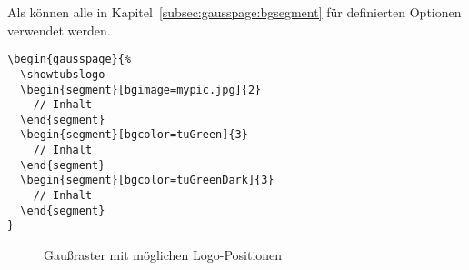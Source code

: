 Als  können alle in Kapitel~\ref{subsec:gausspage:bgsegment}
für  definierten Optionen verwendet werden. %


\begin{lstlisting}[captionpos=b,caption={Beispiel-Nutzung von gausspage}]
\begin{gausspage}{%
  \showtubslogo
  \begin{segment}[bgimage=mypic.jpg]{2}
    // Inhalt
  \end{segment}
  \begin{segment}[bgcolor=tuGreen]{3}
    // Inhalt
  \end{segment}
  \begin{segment}[bgcolor=tuGreenDark]{3}
    // Inhalt
  \end{segment}
}
\end{lstlisting}

\begin{figure}\centering
  \begin{minipage}{0.35\textwidth}
    \label{fig:gausspage:topsender}
  \end{minipage}
  \quad
  \begin{minipage}{0.35\textwidth}
    \label{fig:gausspage:bottomsender}
  \end{minipage}
  \caption{Gaußraster mit möglichen Logo-Positionen}\label{fig:gausspage}
\end{figure}
